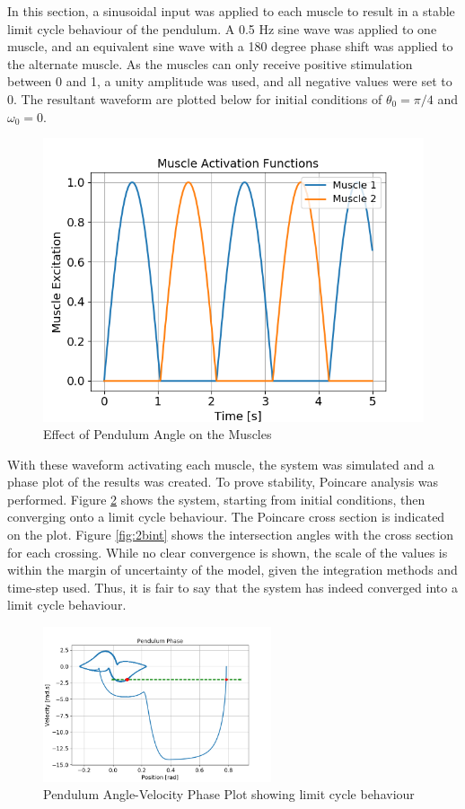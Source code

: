 \documentclass{cmc}
\begin{document}
  In this section, a sinusoidal input was applied to each muscle to result in a stable limit cycle behaviour of the pendulum. A 0.5 Hz sine wave was applied to one muscle, and an equivalent sine wave with a 180 degree phase shift was applied to the alternate muscle. As the muscles can only receive positive stimulation between 0 and 1, a unity amplitude was used, and all negative values were set to 0. The resultant waveform are plotted below for initial conditions of $\theta_0=\pi/4$ and $\omega_0=0$.
  
    \begin{figure}[H]
      \centering
      \includegraphics[width=.7\textwidth]{2b/2b_wave.png}
      \caption{Effect of Pendulum Angle on the Muscles}
      \label{fig:2bwave}
    \end{figure}
  
  With these waveform activating each muscle, the system was simulated and a phase plot of the results was created. To prove stability, Poincare analysis was performed. Figure \ref{fig:2bphase} shows the system, starting from initial conditions, then converging onto a limit cycle behaviour. The Poincare cross section is indicated on the plot. Figure \ref{fig:2bint} shows the intersection angles with the cross section for each crossing. While no clear convergence is shown, the scale of the values is within the margin of uncertainty of the model, given the integration methods and time-step used. Thus, it is fair to say that the system has indeed converged into a limit cycle behaviour. 
  
\begin{figure}[H]
    \centering
    \includegraphics[width=0.6\textwidth]{2b/2b_phase.png}
    \caption{Pendulum Angle-Velocity Phase Plot showing limit cycle behaviour}
    \label{fig:2bphase}
\end{figure}
\end{document}

